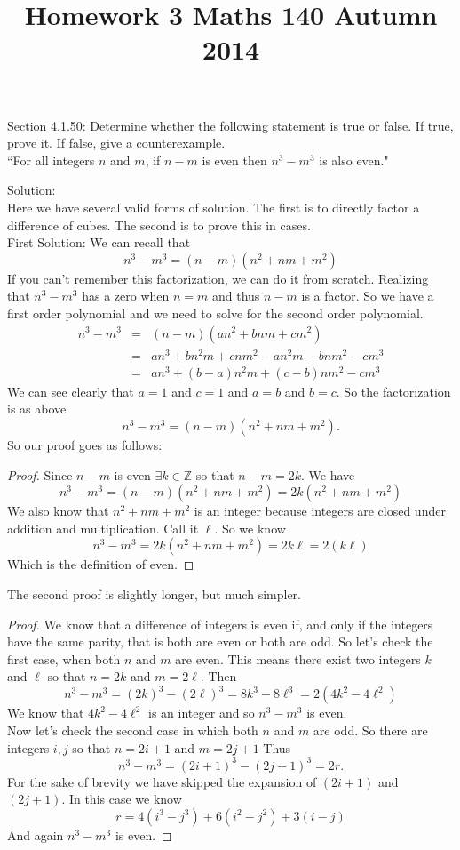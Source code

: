 \documentclass[10 pt]{amsart}
\theoremstyle{definition}
\theoremstyle{remark}
\numberwithin{equation}{subsection}
\newcommand{\Z}{\mathbb{Z}}
\begin{document}
\title{Homework 3 Maths 140 Autumn 2014}
\maketitle

Section 4.1.50: Determine whether the following statement is true or false.  If true, prove it.  If false, give a counterexample.\\

``For all integers $n$ and $m$, if $n-m$ is even then $n^3-m^3$ is also even."

Solution:\\
Here we have several valid forms of solution.  The first is to directly factor a difference of cubes.  The second is to prove this in cases.\\
First Solution:  We can recall that 
\[
n^3-m^3 = (n-m)(n^2+nm+m^2)
\]
If you can't remember this factorization, we can do it from scratch.  Realizing that $n^3-m^3$ has a zero when $n=m$ and thus $n-m$ is a factor.  So we have a first order polynomial and we need to solve for the second order polynomial.
\begin{eqnarray*}
n^3-m^3 & = & (n-m)(an^2 + bnm + cm^2)\\
        & = & an^3 + bn^2m + cnm^2 - an^2m - bnm^2 - cm^3\\
        & = & a n^3 + (b-a)n^2m + (c-b) nm^2- cm^3
\end{eqnarray*}
We can see clearly that $a=1$ and $c=1$ and $a=b$ and $b=c$.  So the factorization is as above
\[
n^3-m^3 = (n-m)(n^2+nm+m^2).
\]
So our proof goes as follows:
\begin{proof}
Since $n-m$ is even $\exists k\in\Z$ so that $n-m=2k$.  We have
\[
n^3-m^3 = (n-m)(n^2+nm+m^2) = 2k(n^2+nm+m^2)
\]
We also know that $n^2+nm+m^2$ is an integer because integers are closed under addition and multiplication.  Call it $\ell$. So we know
\[
n^3-m^3 = 2k(n^2+nm+m^2) = 2k\ell = 2(k\ell)
\]
Which is the definition of even.
\end{proof}


The second proof is slightly longer, but much simpler.  
\begin{proof}
We know that a difference of integers is even if, and only if the integers have the same parity, that is both are even or both are odd.  So let's check the first case, when both $n$ and $m$ are even.  This means there exist two integers $k$ and $\ell$ so that $n=2k$ and $m=2\ell$.  Then
\[
n^3-m^3 = (2k)^3 - (2\ell)^3 = 8k^3 - 8\ell^3 = 2(4k^2-4\ell^2)
\]
We know that $4k^2 -4\ell^2$ is an integer and so $n^3-m^3$ is even.\\
Now let's check the second case in which both $n$ and $m$ are odd.  So there are integers $i,j$ so that $n=2i+1$ and $m=2j+1$ Thus
\[
n^3-m^3 = (2i+1)^3 - (2j+1)^3 = 2r.
\]
For the sake of brevity we have skipped the expansion of $(2i+1)$ and $(2j+1)$.  In this case we know
\[
r = 4(i^3-j^3) + 6(i^2-j^2) + 3(i-j)
\]
And again $n^3-m^3$ is even.
\end{proof}
\end{document}
